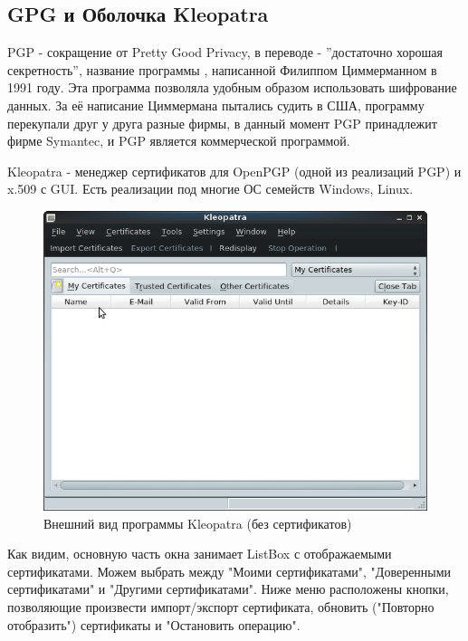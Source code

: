 \documentclass[a4paper]{article}
\begin{document}
\subsection{GPG и Оболочка Kleopatra}

PGP - сокращение от Pretty Good Privacy, в переводе - ''достаточно хорошая секретность'', название программы , написанной Филиппом Циммерманном в 1991 году. Эта программа позволяла удобным образом использовать шифрование данных. За её написание Циммермана пытались судить в США, программу перекупали друг у друга разные фирмы, в данный момент PGP принадлежит фирме Symantec, и PGP является коммерческой программой.


Kleopatra - менеджер сертификатов для OpenPGP (одной из реализаций PGP) и x.509 с GUI. Есть реализации под многие ОС семейств Windows, Linux.

\begin{figure}[H]
	\begin{center}
		\includegraphics[scale=0.5]{pics/Screenshot at 2016-04-18 00:20:42.png}
		\caption{Внешний вид программы Kleopatra (без сертификатов)} 
		\label{pic:pic_name} %
	\end{center}
\end{figure}

Как видим, основную часть окна занимает ListBox с отображаемыми сертификатами. Можем выбрать между "Моими сертификатами", "Доверенными сертификатами" и "Другими сертификатами". Ниже меню расположены кнопки, позволяющие произвести импорт/экспорт сертификата, обновить ("Повторно отобразить") сертификаты и "Остановить операцию".
\end{document}
